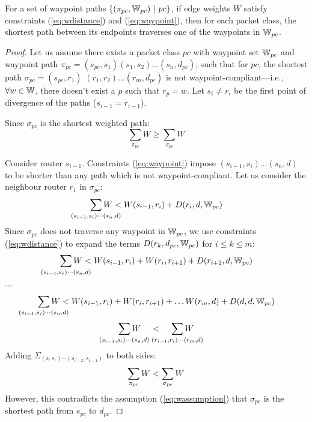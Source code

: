 \begin{theorem}[Soundness] \label{thm:waypoint}
	For a set of waypoint paths $\{(\pi_{pc}, \mathbb{W}_{pc}) ~|~ pc\}$, if edge weights 
	$W$ satisfy constraints (\ref{eq:wdistance}) and (\ref{eq:waypoint}), then for
	each packet class, the shortest path between its endpoints
	traverses one of the waypoints in $\mathbb{W}_{pc}$.
\end{theorem}
\begin{proof}
	Let us assume there exists a packet class $pc$ with waypoint set $\mathbb{W}_{pc}$ 
	and waypoint path $\pi_{pc} = (s_{pc}, s_1)(s_1, s_2)\ldots (s_n, d_{pc})$, 
	such that for $pc$, the 
	shortest path $\sigma_{pc}=(s_{pc}, r_1)$ $(r_1, r_2)\ldots (r_m, d_{pc})$ 
	is not waypoint-compliant---i.e.,  
	$\forall w \in \mathbb{W}$, there doesn't exist a $p$ such that $r_p = w$.
	Let $s_i \not= r_i$ be the first point of divergence of the paths ($s_{i-1} = r_{i-1}$).
	
	
	Since $\sigma_{pc}$ is the shortest weighted path: 
	\begin{equation} \label{eq:wassumption}
	\sum_{\pi_{pc}} W \geq \sum_{\sigma_{pc}} W
	\end{equation}
	
Consider router $s_{i-1}$. 
Constraints (\ref{eq:waypoint}) impose 
$(s_{i-1}, s_i)\ldots(s_n, d)$ to be 
shorter than any path which is not waypoint-compliant. 
Let us consider the neighbour router $r_1$ in $\sigma_{pc}$:
	\[
	\sum_{\mathclap{\substack{(s_{i-1}, s_i)\cdots(s_n, d)}}} 
	W < W(s_{i-1}, r_i)+ D(r_i, d, \waypt_{pc})
	\]
	Since $\sigma_{pc}$ does not traverse any waypoint in $\mathbb{W}_{pc}$,
	we use constraints (\ref{eq:wdistance}) 
	to expand the terms $D(r_k, d_{pc}, \mathbb{W}_{pc})$ for $i \leq k \leq m$:
	\[
	\sum_{\mathclap{\substack{(s_{i-1}, s_i)\cdots(s_n, d)}}} 
	W < W(s_{i-1}, r_i)+ W(r_i, r_{i+1}) + D(r_{i+1}, d,\waypt_{pc})
	\] 
	\begin{center}
		$\ldots$
	\end{center}
	\[
	\sum_{\mathclap{\substack{(s_{i-1}, s_i)\cdots(s_n, d)}}} 
	W < W(s_{i-1}, r_i)+ W(r_i, r_{i+1}) + \ldots W(r_{m}, d) + D(d, d, \waypt_{pc})
	\] 
	\[
	\sum_{\mathclap{\substack{(s_{i-1}, s_i)\cdots(s_n, d)}}} 
	W \hspace{0.4cm}< \hspace{0.4cm}
	\sum_{\mathclap{\substack{(r_{i-1}, r_i)\cdots(r_m, d)}}} 
	W
	\]
	Adding $\Sigma_{(s, s_1)\cdots(s_{i-2},s_{i-1})}$ to both sides:
	\[
	\sum_{\mathclap{\substack{\pi_{pc}}}} 
	W < 
	\sum_{\mathclap{\substack{\sigma_{pc}}}} 
	W
	\] 
However, this contradicts the assumption (\ref{eq:wassumption}) that 
$\sigma_{pc}$ is the shortest path from $s_{pc}$ to $d_{pc}$. 
\end{proof}

